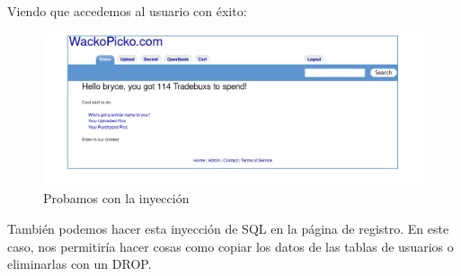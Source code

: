 \documentclass[12pt,twoside]{article}
\begin{document}
Viendo que accedemos al usuario con éxito:

\begin{figure}[H]
    \centering
    \includegraphics[scale=0.45]{./imagenes/inyeccion_sql_bryce_2}
    \caption{Probamos con la inyección}
\end{figure}

También podemos hacer esta inyección de SQL en la página de registro. En este caso, nos permitiría hacer cosas como copiar los datos de las tablas de usuarios o eliminarlas con un DROP. 
\end{document}
